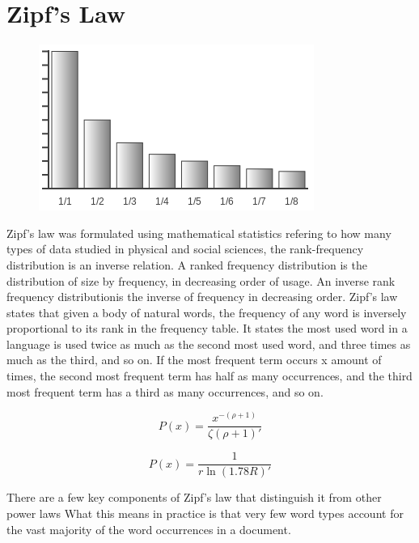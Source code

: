 \documentclass[a4paper,10pt]{article}
\begin{document}
\section{Zipf's Law}

\begin{figure}
	\centering
	\includegraphics[width=0.7\linewidth]{zipf_graph}
	\caption[A perfect example of what Zipf's law would look like on a graph]{}
	\label{fig:zipfgraph}
\end{figure}

Zipf’s law was formulated using mathematical statistics refering to how many types of data studied in  physical and social sciences, the rank-frequency distribution is an inverse relation. A ranked frequency distribution is the distribution of size by frequency, in decreasing order of usage. An inverse rank frequency distributionis the inverse of frequency in decreasing order. Zipf's law states that given a body of natural words, the frequency of any word is inversely proportional to its rank in the frequency table. It states the most used word in a language is used twice as much as the second most used word, and three times as much as the third, and so on. If the most frequent term occurs x amount of times, the second most frequent term has half as many occurrences, and the third most frequent term has a third as many occurrences, and so on. 

\begin{equation}
  P(x) = \frac{x^{-(\rho+1)}}{\zeta (\rho + 1)'}
\end{equation}

\begin{equation}
  P(x) = \frac{1}{r \ln(1.78 R)'}
\end{equation}


There are a few key components of Zipf’s law that distinguish it from other power laws
What this means in practice is that very few word types account for the vast majority of the word occurrences in a document. 
\end{document}
